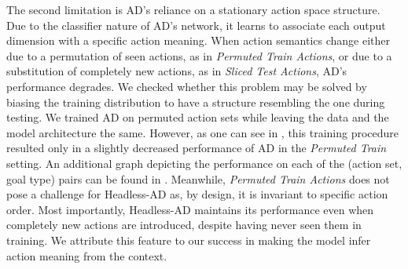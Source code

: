 The second limitation is AD's reliance on a stationary action space structure. Due to the classifier nature of AD's network, it learns to associate each output dimension with a specific action meaning. When action semantics change either due to a permutation of seen actions, as in \textit{Permuted Train Actions}, or due to a substitution of completely new actions, as in \textit{Sliced Test Actions}, AD's performance degrades. We checked whether this problem may be solved by biasing the training distribution to have a structure resembling the one during testing. We trained AD on permuted action sets while leaving the data and the model architecture the same. However, as one can see in , this training procedure resulted only in a slightly decreased performance of AD in the \textit{Permuted Train} setting. An additional graph depicting the performance on each of the (action set, goal type) pairs can be found in . Meanwhile, \textit{Permuted Train Actions} does not pose a challenge for Headless-AD as, by design, it is invariant to specific action order. Most importantly, Headless-AD maintains its performance even when completely new actions are introduced, despite having never seen them in training. We attribute this feature to our success in making the model infer action meaning from the context.


